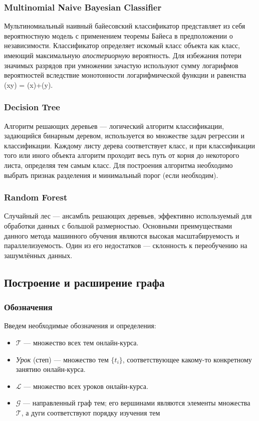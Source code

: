 \documentclass[14pt]{matmex-diploma-custom}
\begin{document}
\subsubsection*{Multinomial Naive Bayesian Classifier}
Мультиномиальный наивный байесовский классификатор представляет из себя вероятностную модель с применением теоремы Байеса в предположении о независимости. Классификатор определяет искомый класс объекта как класс, имеющий максимальную \textit{апостериорную} вероятность. Для избежания потери значимых разрядов при умножении зачастую используют сумму логарифмов вероятностей вследствие монотонности логарифмической функции и равенства \log(x\cdot y) = \log(x)+\log(y).

\subsubsection*{Decision Tree}
Алгоритм решающих деревьев --- логический алгоритм классификации, задающийся бинарным деревом, используется во множестве задач регрессии и классификации. Каждому листу дерева соответствует класс, и при классификации того или иного объекта алгоритм проходит весь путь от корня до некоторого листа, определяя тем самым класс. Для построения алгоритма необходимо выбрать признак разделения и минимальный порог (если необходим). 

\subsubsection*{Random Forest}
Случайный лес --- ансамбль решающих деревьев, эффективно используемый для обработки данных с большой размерностью. Основными преимуществами данного метода машинного обучения являются высокая масштабируемость и параллелизуемость. Один из его недостатков --- склонность к переобучению на зашумлённых данных.

\subsection{Построение и расширение графа}
\subsubsection{Обозначения}
Введем необходимые обозначения и определения:

\begin{itemize}
\item $\mathcal{T}$ --- множество всех тем онлайн-курса.
    \item \textit{Урок} (степ) --- множество тем $\{t_i\}$, соответствующее какому-то конкретному занятию онлайн-курса.
    \item $\mathcal{L}$ --- множество всех уроков онлайн-курса.
    \item $\mathcal{G}$ --- направленный граф тем; его вершинами являются элементы множества $\mathcal{T}$, а дуги соответствуют порядку изучения тем 
\end{itemize}
\end{document}
